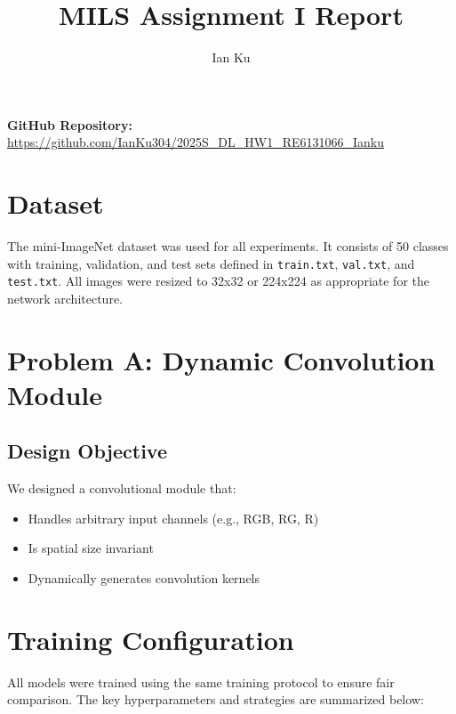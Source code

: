 \documentclass[12pt]{article}
\title{MILS Assignment I Report}
\author{Ian Ku}
\date{}
\begin{document}
\maketitle
\noindent\textbf{GitHub Repository:} \url{https://github.com/IanKu304/2025S_DL_HW1_RE6131066_Ianku}
\section*{Dataset}
The mini-ImageNet dataset was used for all experiments. It consists of 50 classes with training, validation, and test sets defined in \texttt{train.txt}, \texttt{val.txt}, and \texttt{test.txt}. All images were resized to 32x32 or 224x224 as appropriate for the network architecture.

\section*{Problem A: Dynamic Convolution Module}

\subsection*{Design Objective}
We designed a convolutional module that:
\begin{itemize}[noitemsep]
    \item Handles arbitrary input channels (e.g., RGB, RG, R)
    \item Is spatial size invariant
    \item Dynamically generates convolution kernels
\end{itemize}

\section*{Training Configuration}

All models were trained using the same training protocol to ensure fair comparison. The key hyperparameters and strategies are summarized below:
\end{document}
